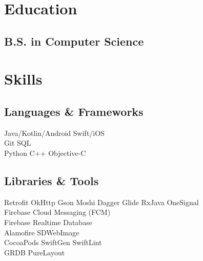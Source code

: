 \documentclass[]{Resume}
\begin{document}
%
%
\lastupdated

%
%

%
%

\begin{minipage}[t]{0.33\textwidth} 


\section{Education} 

\subsection{B.S. in Computer Science}
\sectionsep

\section{Skills}
\subsection{Languages \& Frameworks}
Java/Kotlin/Android \textbullet{} Swift/iOS \textbullet{} \\
Git \textbullet{} SQL \\
Python \textbullet{} C++ \textbullet{} Objective-C
\sectionsep

\subsection{Libraries \& Tools}
Retrofit \textbullet{} OkHttp \textbullet{} Gson \textbullet{} Moshi  \textbullet{} 
Dagger \textbullet{} Glide \textbullet{} RxJava \textbullet{} OneSignal \\
\vspace{\topsep}
Firebase Cloud Messaging (FCM) \textbullet{} \\
Firebase Realtime Database \textbullet{} \\
Alamofire \textbullet{} SDWebImage \textbullet{} \\
CocoaPods \textbullet{} SwiftGen \textbullet{} SwiftLint \textbullet{}  \\
GRDB  \textbullet{} PureLayout
\sectionsep


\end{minipage}
\end{document}
